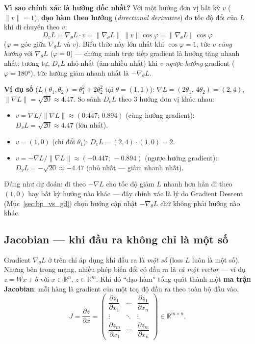 \documentclass[12pt,a4paper]{report}
\newcommand{\en}[1]{\textit{#1}}
\begin{document}
\textbf{Vì sao chính xác là hướng dốc nhất?} Với một hướng đơn vị bất kỳ
$v$ ($\lVert v\rVert=1$), \textbf{đạo hàm theo hướng} (\en{directional
derivative}) đo tốc độ đổi của $L$ khi di chuyển theo $v$:
$$D_v L = \nabla_\theta L \cdot v = \lVert\nabla_\theta L\rVert\,\lVert v\rVert\cos\varphi = \lVert\nabla_\theta L\rVert\cos\varphi$$
($\varphi$ = góc giữa $\nabla_\theta L$ và $v$). Biểu thức này lớn nhất
khi $\cos\varphi=1$, tức $v$ \emph{cùng hướng} với $\nabla_\theta L$
($\varphi=0$) --- chứng minh trực tiếp gradient là hướng tăng nhanh nhất;
tương tự, $D_vL$ nhỏ nhất (âm nhiều nhất) khi $v$ \emph{ngược hướng}
gradient ($\varphi=180°$), tức hướng giảm nhanh nhất là $-\nabla_\theta L$.

\textbf{Ví dụ số} ($L(\theta_1,\theta_2)=\theta_1^2+2\theta_2^2$ tại
$\theta=(1,1)$): $\nabla L = (2\theta_1,\,4\theta_2) = (2,4)$,
$\lVert\nabla L\rVert=\sqrt{20}\approx4.47$. So sánh $D_vL$ theo 3 hướng
đơn vị khác nhau:
\begin{itemize}
\item $v=\nabla L/\lVert\nabla L\rVert\approx(0.447;\,0.894)$ (cùng hướng gradient): $D_vL=\sqrt{20}\approx4.47$ (lớn nhất).
\item $v=(1,0)$ (chỉ đổi $\theta_1$): $D_vL = (2,4)\cdot(1,0)=2$.
\item $v=-\nabla L/\lVert\nabla L\rVert\approx(-0.447;\,-0.894)$ (ngược hướng gradient): $D_vL=-\sqrt{20}\approx-4.47$ (nhỏ nhất --- giảm nhanh nhất).
\end{itemize}
Đúng như dự đoán: đi theo $-\nabla L$ cho tốc độ giảm $L$ nhanh hơn hẳn đi
theo $(1,0)$ hay bất kỳ hướng nào khác --- đây chính xác là lý do
Gradient Descent (Mục~\ref{sec:bp_vs_gd}) chọn hướng cập nhật
$-\nabla_\theta L$ chứ không phải hướng nào khác.

\subsection{Jacobian --- khi đầu ra không chỉ là một số}
\label{sec:jacobian}

Gradient $\nabla_\theta L$ ở trên chỉ áp dụng khi đầu ra là \emph{một số}
(loss $L$ luôn là một số). Nhưng bên trong mạng, nhiều phép biến đổi có
đầu ra là \emph{cả một vector} --- ví dụ $z=Wx+b$ với $x\in\mathbb R^n$,
$z\in\mathbb R^m$. Khi đó ``đạo hàm'' tổng quát thành một \textbf{ma trận
Jacobian}: mỗi hàng là gradient của một toạ độ đầu ra theo toàn bộ đầu vào.
$$J = \frac{\partial z}{\partial x} = \begin{pmatrix}
\dfrac{\partial z_1}{\partial x_1} & \cdots & \dfrac{\partial z_1}{\partial x_n} \\[4pt]
\vdots & \ddots & \vdots \\[2pt]
\dfrac{\partial z_m}{\partial x_1} & \cdots & \dfrac{\partial z_m}{\partial x_n}
\end{pmatrix} \in \mathbb R^{m\times n}.$$
\end{document}
